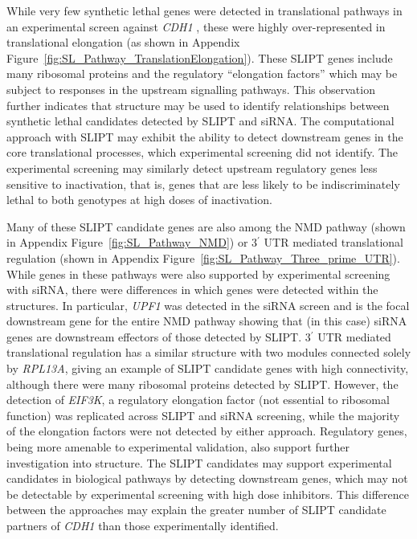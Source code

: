 While very few \gls{synthetic lethal} genes were detected in translational \glspl{pathway} in an experimental screen against \textit{CDH1} \citep{Telford2015}, these were highly over-represented in translational elongation (as shown in Appendix Figure~\ref{fig:SL_Pathway_TranslationElongation}). These \gls{SLIPT} genes include many ribosomal proteins and the regulatory ``elongation factors'' which may be subject to responses in the upstream signalling \glspl{pathway}. This observation further indicates that  structure may be used to identify relationships between \gls{synthetic lethal} candidates detected by \gls{SLIPT} and \gls{siRNA}. The computational approach with \gls{SLIPT} may exhibit the ability to detect downstream genes in the core translational processes, which experimental screening did not identify. The experimental screening may similarly detect upstream regulatory genes less sensitive to inactivation, that is, genes that are less likely to be indiscriminately lethal to both genotypes at high doses of inactivation.

Many of these \gls{SLIPT} candidate genes are also among the \gls{NMD} \gls{pathway} (shown in Appendix Figure~\ref{fig:SL_Pathway_NMD}) or 3$^\prime$ \gls{UTR} mediated translational regulation (shown in Appendix Figure~\ref{fig:SL_Pathway_Three_prime_UTR}). While genes in these \glspl{pathway} were also supported by experimental screening with \gls{siRNA}, there were differences in which genes were detected within the  structures. In particular, \textit{UPF1} was detected in the \gls{siRNA} screen and is the focal downstream gene for the entire \gls{NMD} \gls{pathway} showing that (in this case) \gls{siRNA} genes are downstream effectors of those detected by \gls{SLIPT}.  3$^\prime$ \gls{UTR} mediated translational regulation has a similar structure with two modules connected solely by \textit{RPL13A}, giving an example of \gls{SLIPT} candidate genes with high connectivity, although there were many ribosomal proteins detected by \gls{SLIPT}. However, the detection of \textit{EIF3K}, a regulatory elongation factor (not \gls{essential} to ribosomal function) was replicated across \gls{SLIPT} and \gls{siRNA} screening, while the majority of the elongation factors were not detected by either approach. Regulatory genes, being more amenable to experimental validation, also support further investigation into  structure. The \gls{SLIPT} candidates may support experimental candidates in biological \glspl{pathway} by detecting downstream genes, which may not be detectable by experimental screening with high dose inhibitors. This difference between the approaches may explain the greater number of \gls{SLIPT} candidate partners of \textit{CDH1} than those experimentally identified.


